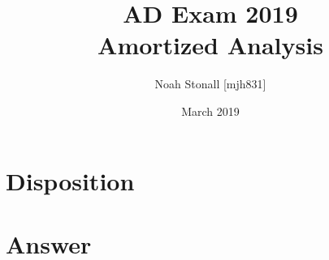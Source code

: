 \documentclass{article}
\title{AD Exam 2019 \\ Amortized Analysis}
\author{Noah Stonall [mjh831]}
\date{March 2019}
\begin{document}
\maketitle

\section*{Disposition}

\newpage
\section*{Answer}

\end{document}
